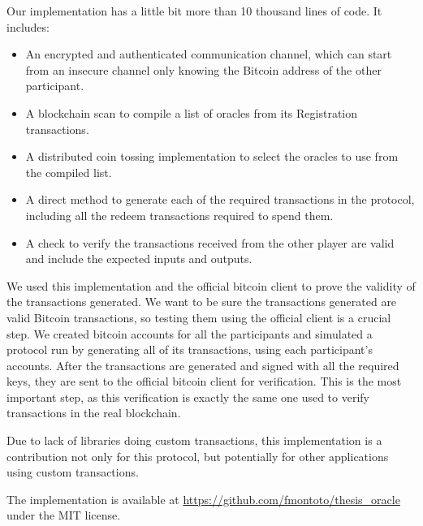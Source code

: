 Our implementation has a little bit more than 10 thousand lines of code.
It includes:
\begin{itemize}
\item An encrypted and authenticated communication channel, which can start from
  an insecure channel only knowing the Bitcoin address of the other
  participant.

\item A blockchain scan to compile a list of oracles from its Registration
  transactions.

\item A distributed coin tossing implementation to select the oracles to use
  from the compiled list.

\item A direct method to generate each of the required transactions in the
  protocol, including all the redeem transactions required to spend them.

\item A check to verify the transactions received from the other player are
  valid and include the expected inputs and outputs.
\end{itemize}

We used this implementation and the official bitcoin client to prove the
  validity of the transactions generated.
We want to be sure the transactions generated are valid Bitcoin transactions,
  so testing them using the official client is a crucial step.
We created bitcoin accounts for all the participants and simulated a
  protocol run by generating all of its transactions, using each participant's
  accounts.
After the transactions are generated and signed with all the required keys,
  they are sent to the official bitcoin client for verification.
This is the most important step, as this verification is exactly the same one
  used to verify transactions in the real blockchain.

Due to lack of libraries doing custom transactions, this implementation is
  a contribution not only for this protocol, but potentially for other
  applications using custom transactions.

The implementation is available at
  \url{https://github.com/fmontoto/thesis_oracle} under the MIT license.
